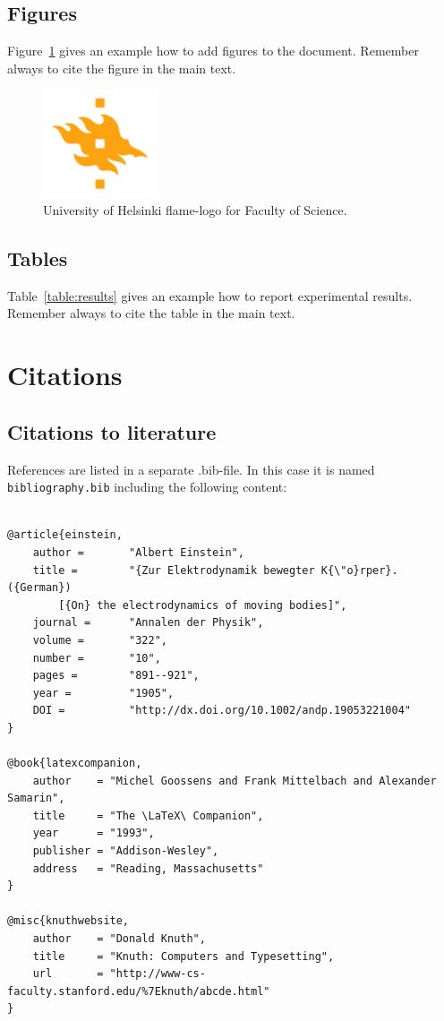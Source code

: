 \section{Figures}
Figure~\ref{fig:logo} gives an example how to add figures to the document. Remember always to cite the figure in the main text.

\begin{figure}[h!] 
\centering 
\includegraphics[width=0.3\textwidth]{HY-logo-ml.png}
\caption{University of Helsinki flame-logo for Faculty of Science.\label{fig:logo}}
\end{figure}

\section{Tables}

Table~\ref{table:results} gives an example how to report experimental results. Remember always to cite the table in the main text. 


\chapter{Citations}

\section{Citations to literature}

References are listed in a separate .bib-file. In this case it is named \texttt{bibliography.bib} including the following content:
\begin{verbatim}

@article{einstein,
    author =       "Albert Einstein",
    title =        "{Zur Elektrodynamik bewegter K{\"o}rper}. ({German})
        [{On} the electrodynamics of moving bodies]",
    journal =      "Annalen der Physik",
    volume =       "322",
    number =       "10",
    pages =        "891--921",
    year =         "1905",
    DOI =          "http://dx.doi.org/10.1002/andp.19053221004"
}
 
@book{latexcompanion,
    author    = "Michel Goossens and Frank Mittelbach and Alexander Samarin",
    title     = "The \LaTeX\ Companion",
    year      = "1993",
    publisher = "Addison-Wesley",
    address   = "Reading, Massachusetts"
}
 
@misc{knuthwebsite,
    author    = "Donald Knuth",
    title     = "Knuth: Computers and Typesetting",
    url       = "http://www-cs-faculty.stanford.edu/%7Eknuth/abcde.html"
}
\end{verbatim}

